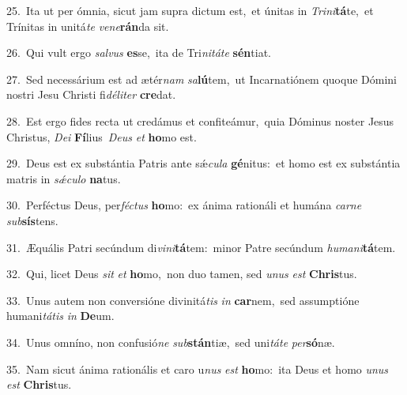 {\numbfont\textcolor{\numbcolor}{25.}}~Ita ut per ómnia, sicut jam supra dictum est,~\dagger et únitas in \textit{Tri}\-\textit{ni}\textbf{tá}te,~\star et Trínitas in unitá\textit{te} \textit{ve}\-\textit{ne}\textbf{rán}da sit.\par
{\numbfont\textcolor{\numbcolor}{26.}}~Qui vult ergo \textit{sal}\-\textit{vus} \textbf{es}\-se,~\star ita de Tri\-\textit{ni}\-\textit{tá}\textit{te} \textbf{sén}\-tiat.\par
{\numbfont\textcolor{\numbcolor}{27.}}~Sed necessárium est ad ætér\textit{nam} \textit{sa}\-\textbf{lú}tem,~\star ut Incarnatiónem quoque Dómini nostri Jesu Christi fi\-\textit{dé}\-\textit{li}\textit{ter} \textbf{cre}\-dat.\par
{\numbfont\textcolor{\numbcolor}{28.}}~Est ergo fides recta ut credámus et confiteámur,~\dagger quia Dóminus noster Jesus Christus, \textit{De}\-\textit{i} \textbf{Fí}\-lius~\star \textit{De}\-\textit{us} \textit{et} \textbf{ho}\-mo est.\par
{\numbfont\textcolor{\numbcolor}{29.}}~Deus est ex substántia Patris ante sǽ\-\textit{cu}\-\textit{la} \textbf{gé}\-nitus:~\star et homo est ex substántia matris in \textit{sǽ}\-\textit{cu}\textit{lo} \textbf{na}\-tus.\par
{\numbfont\textcolor{\numbcolor}{30.}}~Perféctus Deus, per\-\textit{féc}\-\textit{tus} \textbf{ho}\-mo:~\star ex ánima rationáli et humána \textit{car}\-\textit{ne} \textit{sub}\-\textbf{sís}tens.\par
{\numbfont\textcolor{\numbcolor}{31.}}~Æquális Patri secúndum di\-\textit{vi}\-\textit{ni}\textbf{tá}tem:~\star minor Patre secúndum \textit{hu}\-\textit{ma}\textit{ni}\textbf{tá}tem.\par
{\numbfont\textcolor{\numbcolor}{32.}}~Qui, licet Deus \textit{sit} \textit{et} \textbf{ho}\-mo,~\star non duo tamen, sed \textit{u}\-\textit{nus} \textit{est} \textbf{Chris}\-tus.\par
{\numbfont\textcolor{\numbcolor}{33.}}~Unus autem non conversióne divinitá\textit{tis} \textit{in} \textbf{car}\-nem,~\star sed assumptióne humani\-\textit{tá}\-\textit{tis} \textit{in} \textbf{De}\-um.\par
{\numbfont\textcolor{\numbcolor}{34.}}~Unus omníno, non confusió\textit{ne} \textit{sub}\-\textbf{stán}tiæ,~\star sed uni\-\textit{tá}\-\textit{te} \textit{per}\-\textbf{só}næ.\par
{\numbfont\textcolor{\numbcolor}{35.}}~Nam sicut ánima rationális et caro u\textit{nus} \textit{est} \textbf{ho}\-mo:~\star ita Deus et homo \textit{u}\-\textit{nus} \textit{est} \textbf{Chris}\-tus.\par
